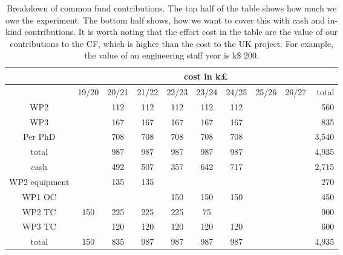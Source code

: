\begin{table}[htb]
    \centering
    \begin{tabular}{|c||c|c|c|c|c|c|c|c||r|}
        \cline{2-10} \multicolumn{1}{c|}{\ } & \multicolumn{9}{c|}{cost in k£}\\
         \hline
           & 19/20 & 20/21 & 21/22 & 22/23 & 23/24 & 24/25 & 25/26 & 26/27 & total\\
         \hline\hline
         WP2     & & 112 & 112 & 112 & 112 & 112 & & & 560  \\ %
         WP3     & & 167 & 167 & 167 & 167 & 167 & & & 835  \\ %
         Per PhD & & 708 & 708 & 708 & 708 & 708 & & & 3,540 \\
         \hline
         total  &  & 987 & 987 & 987 & 987 & 987 & & & 4,935 \\
         \hline\hline
         cash          &     & 492 & 507 & 357 & 642 & 717 &     &     & 2,715 \\ %
         WP2 equipment &     & 135 & 135 &     &     &     &     &     & 270 \\ %
         WP1 OC        &     &     &     & 150 & 150 & 150 &     &     & 450 \\ %
         WP2 TC        & 150 & 225 & 225 & 225 &  75 &     &     &     & 900 \\ %
         WP3 TC        &     & 120 & 120 & 120 & 120 & 120 &     &     & 600 \\ %
         \hline         
         total         & 150 & 835 & 987 & 987 & 987 & 987 &     &     & 4,935 \\
         \hline
    \end{tabular}
    \caption{Breakdown of common fund contributions. The top half of the table shows how much we owe the experiment. The bottom half shows, how we want to cover this with cash and in-kind contributions. It is worth noting that the effort cost in the table are the value of our contributions to the CF, which is higher than the cost to the UK project. For example, the value of an engineering staff year is k\$ 200. }
    \label{tab:CF}
\end{table}

